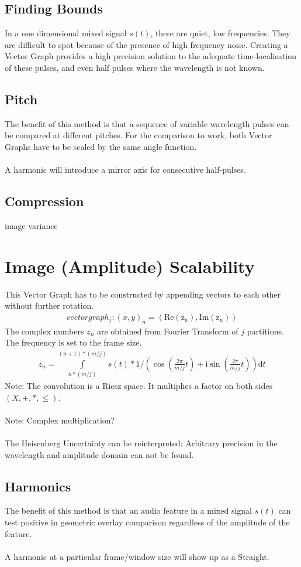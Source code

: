\documentclass{report}
\begin{document}
\subsection{Finding Bounds}
In a one dimensional mixed signal $s(t)$, there are quiet, low frequencies. They are difficult to spot because of the presence of high frequency noise. Creating a Vector Graph provides a high precision solution to the adequate time-localisation of these pulses, and even half pulses where the wavelength is not known.
\subsection{Pitch}
The benefit of this method is that a sequence of variable wavelength pulses can be compared at different pitches. For the comparison to work, both Vector Graphs have to be scaled by the same angle function.\\\\
A harmonic will introduce a mirror axis for consecutive half-pulses.
\subsection{Compression}
image variance
\section{Image (Amplitude) Scalability}
This Vector Graph has to be constructed by appending vectors to each other without further rotation.
\begin{align}
vectorgraph_{j}: (x,y)_{n}=(\mathrm{Re(z_{n})},\mathrm{Im(z_{n})})
\end{align}
The complex numbers $z_{n}$ are obtained from Fourier Transform of $j$ partitions. The frequency is set to the frame size.
\begin{align}
z_{n}= \int \limits _{n*(m/j)}^{(n+1)*(m/j)} s(t)*1/(\cos(\frac{2\pi}{m/j}t)+\mathrm{i}\sin(\frac{2\pi}{m/j}t))\mathrm{d}t
\end{align}
Note: The convolution is a Riesz space. It multiplies a factor on both sides $(X,+,*,\leq)$.\\\\
Note: Complex multiplication?\\\\
The Heisenberg Uncertainty can be reinterpreted: Arbitrary precision in the wavelength and amplitude domain can not be found.
\subsection{Harmonics}
The benefit of this method is that an audio feature in a mixed signal $s(t)$ can test positive in geometric overlay comparison regardless of the amplitude of the feature.\\\\
A harmonic at a particular frame/window size will show up as a Straight.
\end{document}
